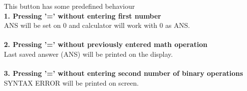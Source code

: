 \documentclass[11pt, a4paper]{article}
\begin{document}
    This button has some predefined behaviour \\

    \noindent
    \textbf{1. Pressing '=' without entering first number} \\
    \indent ANS will be set on 0 and calculator will work with 0 as ANS. \\\\
    \textbf{2. Pressing '=' without previously entered math operation} \\
    \indent Last saved answer (ANS) will be printed on the display. \\\\
    \textbf{3. Pressing '=' without entering second number of binary operations} \\
    \indent SYNTAX ERROR will be printed on screen.
    \newpage
\end{document}
